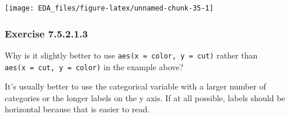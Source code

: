 \documentclass[]{book}
\newenvironment{Shaded}{\begin{snugshade}}{\end{snugshade}}
\newcommand{\DataTypeTok}[1]{\textcolor[rgb]{0.13,0.29,0.53}{#1}}
\newcommand{\DecValTok}[1]{\textcolor[rgb]{0.00,0.00,0.81}{#1}}
\newcommand{\KeywordTok}[1]{\textcolor[rgb]{0.13,0.29,0.53}{\textbf{#1}}}
\newcommand{\NormalTok}[1]{#1}
\newcommand{\OperatorTok}[1]{\textcolor[rgb]{0.81,0.36,0.00}{\textbf{#1}}}
\newcommand{\OtherTok}[1]{\textcolor[rgb]{0.56,0.35,0.01}{#1}}
\newcommand{\StringTok}[1]{\textcolor[rgb]{0.31,0.60,0.02}{#1}}
\theoremstyle{plain}
\theoremstyle{remark}
\begin{document}
\begin{Shaded}
\end{Shaded}

\begin{center}\texttt{[image: EDA\_files/figure-latex/unnamed-chunk-35-1]} \end{center}

\hypertarget{exercise-7.5.2.1.3}{%
\subsubsection*{\texorpdfstring{Exercise
{7.5.2.1.3}}{Exercise 7.5.2.1.3}}\label{exercise-7.5.2.1.3}}

Why is it slightly better to use \texttt{aes(x\ =\ color,\ y\ =\ cut)}
rather than \texttt{aes(x\ =\ cut,\ y\ =\ color)} in the example above?

It's usually better to use the categorical variable with a larger number
of categories or the longer labels on the y axis. If at all possible,
labels should be horizontal because that is easier to read.
\end{document}
